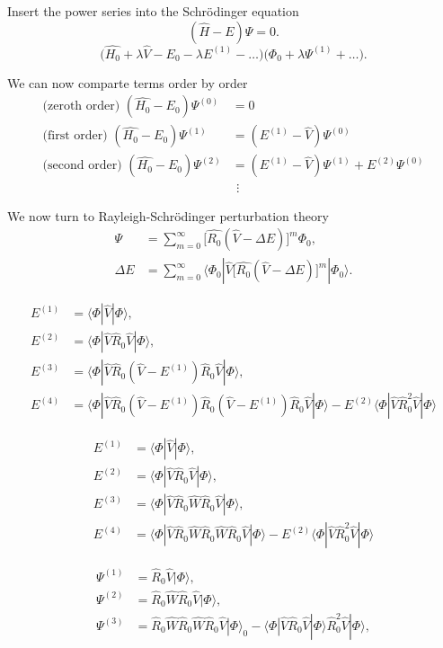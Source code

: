 \documentclass[12pt]{beamer}
\newcommand{\ket}[1]{|#1 \rangle}
\newcommand{\op}[1]{\hat{#1}}
\newcommand{\braopket}[3]{\langle #1 | {#2} | #3 \rangle}
\begin{document}
\begin{frame}[fragile]
Insert the power series into the Schrödinger equation
$$(\op{H}-E)\Psi = 0.$$
$$(\op{H_0} + \lambda\op{V} - E_{0} - \lambda E^{(1)} -\ldots\big)\big(\Phi_0 + \lambda\Psi^{(1)} + \ldots\big). $$

We can now comparte terms order by order
\begin{align*}
\mbox{(zeroth order) } (\op{H_0} - E_0)\Psi^{(0)} &= 0 \\
\mbox{(first order)  } (\op{H_0} - E_0)\Psi^{(1)} &= (E^{(1)} - \op{V})\Psi^{(0)} \\
\mbox{(second order) } (\op{H_0} - E_0)\Psi^{(2)} &= (E^{(1)} - \op{V})\Psi^{(1)} + E^{(2)}\Psi^{(0)} \\
&\ \, \vdots
\end{align*}
\end{frame}

\begin{frame}[fragile]
{\large \color{DarkFern} We now turn to Rayleigh-Schrödinger perturbation theory}
\begin{align*}
\Psi &= \sum_{m=0}^\infty \bigg[\op{R_0}(\op{V} - \Delta E)\bigg]^m \Phi_0, \\
\Delta E &= \sum_{m=0}^\infty \braopket{\Phi_0}{\op{V}\bigg[\op{R_0}(\op{V} - \Delta E)\bigg]^m}{\Phi_0}.
\end{align*}

 {
\begin{align*}
E^{(1)} &= \braopket{\Phi}{\op{V}}{\Phi}, \\
E^{(2)} &= \braopket{\Phi}{\op{V}\op{R}_0\op{V}}{\Phi}, \\
E^{(3)} &= \braopket{\Phi}{\op{V}\op{R}_0(\op{V}-E^{(1)})\op{R}_0\op{V}}{\Phi}, \\
E^{(4)} &= \braopket{\Phi}{\op{V}\op{R}_0(\op{V}-E^{(1)})\op{R}_0(\op{V}-E^{(1)})\op{R}_0\op{V}}{\Phi} - E^{(2)}\braopket{\Phi}{\op{V}\op{R}_0^2 \op{V}}{\Phi}
\end{align*}	
}
\end{frame}

\begin{frame}[fragile]
\begin{align*}
E^{(1)} &= \braopket{\Phi}{\op{V}}{\Phi}, \\
E^{(2)} &= \braopket{\Phi}{\op{V}\op{R}_0\op{V}}{\Phi}, \\
E^{(3)} &= \braopket{\Phi}{\op{V}\op{R}_0\op{W}\op{R}_0\op{V}}{\Phi}, \\
E^{(4)} &= \braopket{\Phi}{\op{V}\op{R}_0\op{W}\op{R}_0\op{W}\op{R}_0\op{V}}{\Phi} - E^{(2)}\braopket{\Phi}{\op{V}\op{R}_0^2 \op{V}}{\Phi}
\end{align*}

\begin{align*}
\Psi^{(1)} &= \op{R}_0\op{V}\ket{\Phi}, \\
\Psi^{(2)} &= \op{R}_0\op{W}\op{R}_0\op{V}\ket{\Phi}, \\
\Psi^{(3)} &= \op{R}_0\op{W}\op{R}_0\op{W}\op{R}_0\op{V}\ket{\Phi}_0 - \braopket{\Phi}{\op{V}\op{R}_0\op{V}}{\Phi}\op{R}_0^2\op{V}\ket{\Phi}, \\
\end{align*}	
\end{frame}
\end{document}
